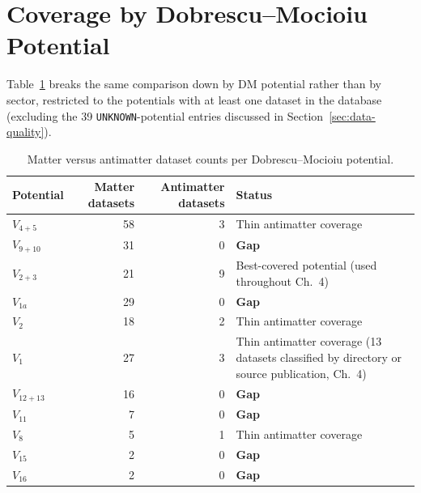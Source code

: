 \documentclass[main]{subfiles}
\begin{document}
\section{Coverage by Dobrescu--Mocioiu Potential}
\label{sec:potential-gaps}

Table~\ref{tab:potential-gaps} breaks the same comparison down by DM
potential rather than by sector, restricted to the potentials with at least
one dataset in the database (excluding the 39 \texttt{UNKNOWN}-potential
entries discussed in Section~\ref{sec:data-quality}).

\begin{table}[h]
\centering
\begin{tabular}{@{}lrrl@{}}
\toprule
Potential & Matter datasets & Antimatter datasets & Status \\
\midrule
$V_{4+5}$  & 58 & 3 & Thin antimatter coverage \\
$V_{9+10}$ & 31 & 0 & \textbf{Gap} \\
$V_{2+3}$  & 21 & 9 & Best-covered potential (used throughout Ch.~4) \\
$V_{1a}$   & 29 & 0 & \textbf{Gap} \\
$V_2$      & 18 & 2 & Thin antimatter coverage \\
$V_1$      & 27 & 3 & Thin antimatter coverage (13 datasets classified by directory or source publication, Ch.~4) \\
$V_{12+13}$& 16 & 0 & \textbf{Gap} \\
$V_{11}$   & 7  & 0 & \textbf{Gap} \\
$V_8$      & 5  & 1 & Thin antimatter coverage \\
$V_{15}$   & 2  & 0 & \textbf{Gap} \\
$V_{16}$   & 2  & 0 & \textbf{Gap} \\
\bottomrule
\end{tabular}
\caption{Matter versus antimatter dataset counts per Dobrescu--Mocioiu potential.}
\label{tab:potential-gaps}
\end{table}
\end{document}
